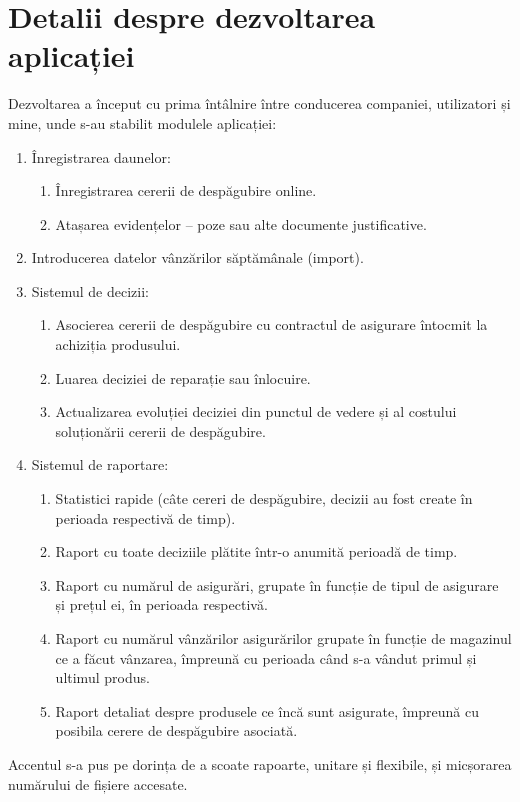 \section{Detalii despre dezvoltarea aplicației}

	Dezvoltarea a început cu prima întâlnire între conducerea companiei, utilizatori și mine, unde s-au stabilit modulele aplicației:
	\begin{enumerate}
		\item Înregistrarea daunelor:
		\begin{enumerate}
			\item Înregistrarea cererii de despăgubire online.
			\item Atașarea evidențelor -- poze sau alte documente justificative.
		\end{enumerate}
		\item Introducerea datelor vânzărilor săptămânale (import).
		\item Sistemul de decizii:
		\begin{enumerate}
			\item Asocierea cererii de despăgubire cu contractul de asigurare întocmit la achiziția produsului.
			\item Luarea deciziei de reparație sau înlocuire.
			\item Actualizarea evoluției deciziei din punctul de vedere și al costului soluționării cererii de despăgubire.
		\end{enumerate}
		\item Sistemul de raportare:
		\begin{enumerate}
			\item Statistici rapide (câte cereri de despăgubire, decizii au fost create în perioada respectivă de timp).
			\item Raport cu toate deciziile plătite într-o anumită perioadă de timp.
			\item Raport cu numărul de asigurări, grupate în funcție de tipul de asigurare și prețul ei, în perioada respectivă.
			\item Raport cu numărul vânzărilor asigurărilor grupate în funcție de magazinul ce a făcut vânzarea, împreună cu perioada când s-a vândut primul și ultimul produs.
			\item Raport detaliat despre produsele ce încă sunt asigurate, împreună cu posibila cerere de despăgubire asociată.
		\end{enumerate}
	\end{enumerate}

	Accentul s-a pus pe dorința de a scoate rapoarte, unitare și flexibile, și micșorarea numărului de fișiere accesate.

